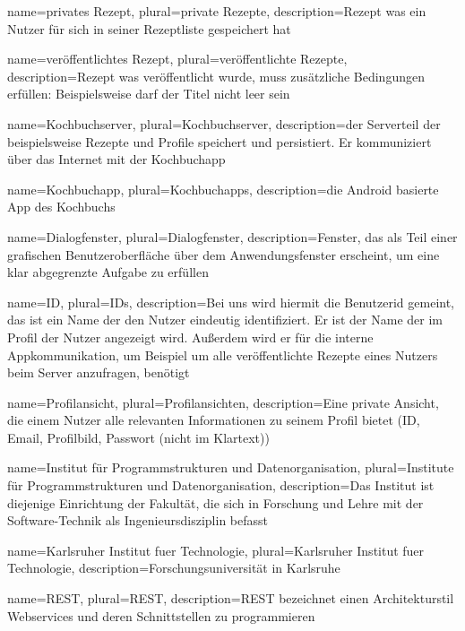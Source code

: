 {
	name=privates Rezept,
	plural=private Rezepte,
	description={Rezept was ein Nutzer für sich in seiner Rezeptliste gespeichert hat}
}

{
	name=veröffentlichtes Rezept,
	plural=veröffentlichte Rezepte,
	description={Rezept was veröffentlicht wurde, muss zusätzliche Bedingungen erfüllen: Beispielsweise darf der Titel nicht leer sein}
}

{
	name=Kochbuchserver,
	plural=Kochbuchserver,
	description={der Serverteil der beispielsweise Rezepte und Profile speichert und persistiert. Er kommuniziert über das Internet mit der Kochbuchapp}
}

{
	name=Kochbuchapp,
	plural=Kochbuchapps,
	description={die Android basierte App des Kochbuchs}
}

{
	name=Dialogfenster,
	plural=Dialogfenster,
	description={Fenster, das als Teil einer grafischen Benutzeroberfläche über dem Anwendungsfenster erscheint, um eine klar abgegrenzte Aufgabe zu erfüllen}
}

{
	name=ID,
	plural=IDs,
	description={Bei uns wird hiermit die Benutzerid gemeint, das ist ein Name der den Nutzer eindeutig identifiziert. Er ist der Name der im Profil der Nutzer angezeigt wird. Außerdem wird er für die interne Appkommunikation, um Beispiel um alle veröffentlichte Rezepte eines Nutzers beim Server anzufragen, benötigt}
}

{
	name=Profilansicht,
	plural=Profilansichten,
	description={Eine private Ansicht, die einem Nutzer alle relevanten Informationen zu seinem Profil bietet (ID, Email, Profilbild, Passwort (nicht im Klartext))}
}

{
	name=Institut für Programmstrukturen und Datenorganisation,
	plural=Institute für Programmstrukturen und Datenorganisation,
	description={Das Institut ist diejenige Einrichtung der Fakultät, die sich in Forschung und Lehre mit der Software-Technik als Ingenieursdisziplin befasst}
}

{
	name=Karlsruher Institut fuer Technologie,
	plural=Karlsruher Institut fuer Technologie,
	description={Forschungsuniversität in Karlsruhe}
}

{
	name=REST,
	plural=REST,
	description={REST bezeichnet einen Architekturstil Webservices und deren Schnittstellen zu programmieren}
}

